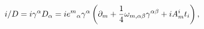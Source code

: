 \begin{equation}
i\slash D = i\gamma^\alpha D_\alpha=i{e^m}_\alpha \gamma^\alpha 
\left(\partial_m + {1\over 4}\omega_{m,\alpha\beta}\gamma^{\alpha\beta}
+iA^i_m t_i\right),
\end{equation}

